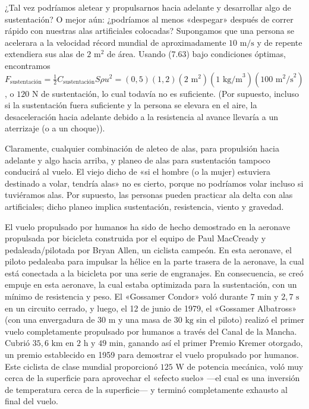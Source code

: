 \documentclass[12pt]{book}
\begin{document}
¿Tal vez podríamos aletear y propulsarnos hacia adelante y desarrollar algo de sustentación? O mejor aún: ¿podríamos al menos «despegar» después de correr rápido con nuestras alas artificiales colocadas? Supongamos que una persona se acelerara a la velocidad récord mundial de aproximadamente $10\text{ m/s}$ y de repente extendiera sus alas de $2\text{ m}^2$ de área. Usando (7.63) bajo condiciones óptimas, encontramos $F_{\text{sustentación}} = \frac{1}{2} C_{\text{sustentación}} S \rho u^2 = (0{,}5)(1{,}2)(2\text{ m}^2)(1\text{ kg/m}^3)(100\text{ m}^2\text{/s}^2)$, o $120\text{ N}$ de sustentación, lo cual todavía no es suficiente. (Por supuesto, incluso si la sustentación fuera suficiente y la persona se elevara en el aire, la desaceleración hacia adelante debido a la resistencia al avance llevaría a un aterrizaje (o a un choque)).

Claramente, cualquier combinación de aleteo de alas, para propulsión hacia adelante y algo hacia arriba, y planeo de alas para sustentación tampoco conducirá al vuelo. El viejo dicho de «si el hombre (o la mujer) estuviera destinado a volar, tendría alas» no es cierto, porque no podríamos volar incluso si tuviéramos alas. Por supuesto, las personas pueden practicar ala delta con alas artificiales; dicho planeo implica sustentación, resistencia, viento y gravedad.

El vuelo propulsado por humanos ha sido de hecho demostrado en la aeronave propulsada por bicicleta construida por el equipo de Paul MacCready y pedaleada/pilotada por Bryan Allen, un ciclista campeón. En esta aeronave, el piloto pedaleaba para impulsar la hélice en la parte trasera de la aeronave, la cual está conectada a la bicicleta por una serie de engranajes. En consecuencia, se creó empuje en esta aeronave, la cual estaba optimizada para la sustentación, con un mínimo de resistencia y peso. El «Gossamer Condor» voló durante $7\text{ min y }2{,}7\text{ s}$ en un circuito cerrado, y luego, el 12 de junio de 1979, el «Gossamer Albatross» (con una envergadura de $30\text{ m}$ y una masa de $30\text{ kg}$ sin el piloto) realizó el primer vuelo completamente propulsado por humanos a través del Canal de la Mancha. Cubrió $35{,}6\text{ km}$ en $2\text{ h y }49\text{ min}$, ganando así el primer Premio Kremer otorgado, un premio establecido en 1959 para demostrar el vuelo propulsado por humanos. Este ciclista de clase mundial proporcionó $125\text{ W}$ de potencia mecánica, voló muy cerca de la superficie para aprovechar el «efecto suelo» ---el cual es una inversión de temperatura cerca de la superficie--- y terminó completamente exhausto al final del vuelo.
\end{document}
